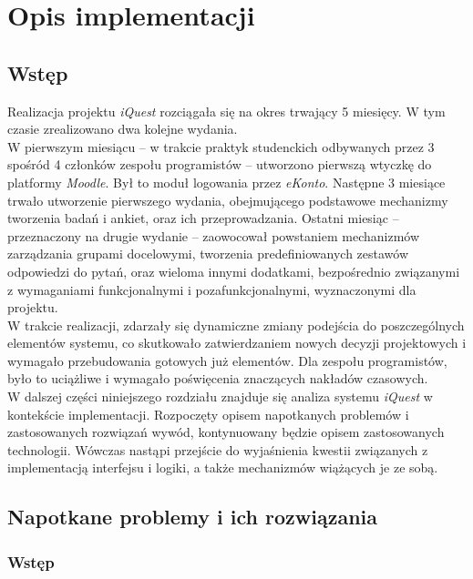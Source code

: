 \chapter{Opis implementacji}
\label{Chapter6}

\section{Wstęp}
\label{Chapter61}

Realizacja projektu \textit{iQuest} rozciągała się na okres trwający 5 miesięcy. W tym czasie zrealizowano dwa kolejne wydania. \\

W pierwszym miesiącu -- w trakcie praktyk studenckich odbywanych przez 3 spośród 4 członków zespołu programistów -- utworzono pierwszą wtyczkę do platformy \textit{Moodle}. Był to moduł logowania przez \textit{eKonto}. Następne 3 miesiące trwało utworzenie pierwszego wydania, obejmującego podstawowe mechanizmy tworzenia badań i ankiet, oraz ich przeprowadzania. Ostatni miesiąc -- przeznaczony na drugie wydanie -- zaowocował powstaniem mechanizmów zarządzania grupami docelowymi, tworzenia predefiniowanych zestawów odpowiedzi do pytań, oraz wieloma innymi dodatkami, bezpośrednio związanymi z wymaganiami funkcjonalnymi i pozafunkcjonalnymi, wyznaczonymi dla projektu. \\

W trakcie realizacji, zdarzały się dynamiczne zmiany podejścia do poszczególnych elementów systemu, co skutkowało zatwierdzaniem nowych decyzji projektowych i wymagało przebudowania gotowych już elementów. Dla zespołu programistów, było to uciążliwe i wymagało poświęcenia znaczących nakładów czasowych. \\

W dalszej części niniejszego rozdziału znajduje się analiza systemu \textit{iQuest} w kontekście implementacji. Rozpoczęty opisem napotkanych problemów i zastosowanych rozwiązań wywód, kontynuowany będzie opisem zastosowanych technologii. Wówczas nastąpi przejście do wyjaśnienia kwestii związanych z implementacją interfejsu i logiki, a także mechanizmów wiążących je ze sobą.

\section{Napotkane problemy i ich rozwiązania}
\label{Chapter62}

\subsection{Wstęp}
\label{Chapter621}

